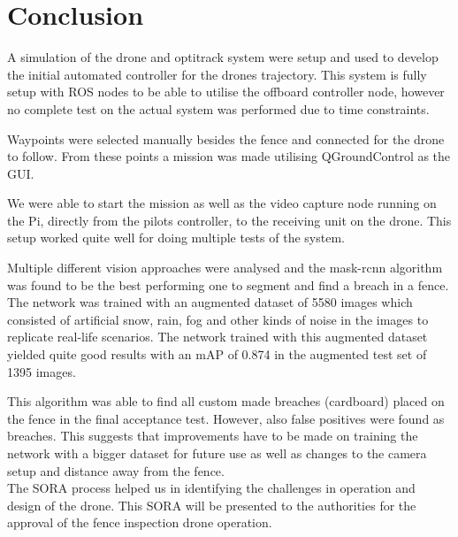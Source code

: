 \documentclass[../Head/Main.tex]{subfiles}
\begin{document}
\section{Conclusion}
\label{sec:conclusion}

A simulation of the drone and optitrack system were setup and used to develop the initial automated controller for the drones trajectory. This system is fully setup with ROS nodes to be able to utilise the offboard controller node, however no complete test on the actual system was performed due to time constraints. 

Waypoints were selected manually besides the fence and connected for the drone to follow. From these points a mission was made utilising QGroundControl as the GUI. 

We were able to start the mission as well as the video capture node running on the Pi, directly from the pilots controller, to the receiving unit on the drone. This setup worked quite well for doing multiple tests of the system. 

\par 
Multiple different vision approaches were analysed and the mask-rcnn algorithm was found to be the best performing one to segment and find a breach in a fence. The network was trained with an augmented dataset of 5580 images which consisted of artificial snow, rain, fog and other kinds of noise in the images to replicate real-life scenarios. The network trained with this augmented dataset yielded quite good results with an mAP of 0.874 in the augmented test set of 1395 images.

This algorithm was able to find all custom made breaches (cardboard) placed on the fence in the final acceptance test. However, also false positives were found as breaches. This suggests that improvements have to be made on training the network with a bigger dataset for future use as well as changes to the camera setup and distance away from the fence.
\\
The SORA process helped us in identifying the challenges in operation and design of the drone. This SORA will be presented to the authorities for the approval of the fence inspection drone operation.
\end{document}
